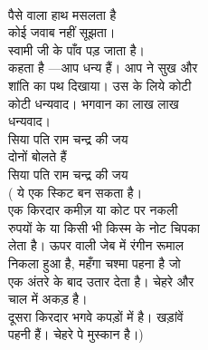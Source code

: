 {{{{{{{{{{{{\\
पैसे वाला हाथ मसलता है\\
कोई जवाब नहीं सूझता।\\
स्वामी जी के पाँव पड़ जाता है।\\
कहता है —आप धन्य हैं। आप ने सुख और\\
शांति का पथ दिखाया। उस के लिये कोटी\\
कोटी धन्यवाद। भगवान का लाख लाख\\
धन्यवाद।\\
सिया पति राम चन्द्र की जय\\
दोनों बोलते हैं\\
सिया पति राम चन्द्र की जय\\
( ये एक स्किट बन सकता है।\\
एक किरदार कमीज़ या कोट पर नकली\\
रुपयों के या किसी भी किस्म के नोट चिपका\\
लेता है। ऊपर वाली जेब में रंगीन रूमाल\\
निकला हुआ है, महँगा चश्मा पहना है जो\\
एक अंतरे के बाद उतार देता है। चेहरे और\\
चाल में अकड़ है।\\
दूसरा किरदार भगवे कपड़ों में है। खड़ांवें\\
पहनी हैं। चेहरे पे मुस्कान है।)\\
\\
\\
\\
}}}}}}}}}}}}
